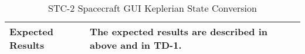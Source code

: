 \begin{table}[htbp!]
\begin{tabular}{|p{1.05 in} |p{4.75 in} |}
         \hline
         Expected Results & The expected results are described in above and in TD-1.\\
      \hline
\end{tabular}
      \label{Table: STC-2}
      \caption{STC-2 Spacecraft GUI Keplerian State Conversion}
\end{table} 